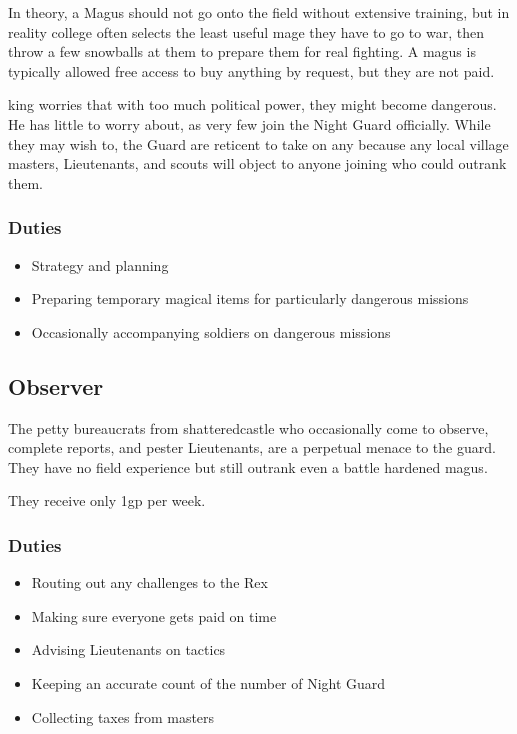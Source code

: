 \begin{multicols}{2}
In theory, a Magus should not go onto the field without extensive training, but in reality \gls{college} often selects the least useful mage they have to go to war, then throw a few snowballs at them to prepare them for real fighting.
A magus is typically allowed free access to buy anything by request, but they are not paid.

\Gls{king} worries that with too much political power, they might become dangerous.
He has little to worry about, as very few join the Night Guard officially.
While they may wish to, the Guard are reticent to take on any because any local village masters, Lieutenants, and scouts will object to anyone joining who could outrank them.

\subsubsection{Duties}

\begin{itemize}

  \item{Strategy and planning}
  \item{Preparing temporary magical items for particularly dangerous missions}
  \item{Occasionally accompanying soldiers on dangerous missions}

\end{itemize}

\subsection{Observer}

The petty bureaucrats from \gls{shatteredcastle} who occasionally come to observe, complete reports, and pester Lieutenants, are a perpetual menace to the \gls{guard}.
They have no field experience but still outrank even a battle hardened magus.

They receive only 1gp per week.

\subsubsection{Duties}

\begin{itemize}

  \item{Routing out any challenges to the Rex}
  \item{Making sure everyone gets paid on time}
  \item{Advising Lieutenants on tactics}
  \item{Keeping an accurate count of the number of Night Guard}
  \item{Collecting taxes from masters}


\end{itemize}
\end{multicols}

